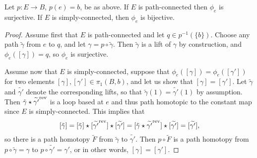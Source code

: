\begin{prop}
  \label{lifting-correspondence-props}
  Let $p : E \to B$, $p(e) = b$, be as above. If $E$ is path-connected then $\phi_e$ is surjective. If $E$ is simply-connected, then $\phi_e$ is bijective.
\end{prop}
\begin{proof}
  Assume first that $E$ is path-connected and let $q \in p^{-1}(\{b\})$. Choose any path $\tilde{\gamma}$ from $e$ to $q$, and let $\gamma = p \circ \tilde{\gamma}$. Then $\tilde{\gamma}$ is a lift of $\gamma$ by construction, and $\phi_e([\gamma]) = q$, so $\phi_e$ is surjective.
  
  Assume now that $E$ is simply-connected, suppose that $\phi_e([\gamma]) = \phi_e([\gamma'])$ for two elements $[\gamma], [\gamma'] \in \pi_1(B,b)$, and let us show that $[\gamma] = [\gamma']$. Let $\tilde{\gamma}$ and $\widetilde{\gamma'}$ denote the corresponding lifts, so that $\tilde{\gamma}(1) = \tilde{\gamma'}(1)$ by assumption. Then $\tilde{\gamma} \star \widetilde{\gamma'}^{\mathrm{rev}}$ is a loop based at $e$ and thus path homotopic to the constant map since $E$ is simply-connected. This implies that
  \[
    [\tilde{\gamma}] = [\tilde{\gamma}] \star [\widetilde{\gamma'}^{\mathrm{rev}}] \star [\widetilde{\gamma'}] = [\tilde{\gamma} \star \widetilde{\gamma'}^{\mathrm{rev}}] \star [\widetilde{\gamma'}] = [\widetilde{\gamma'}],
  \]
  so there is a path homotopy $\tilde{F}$ from $\tilde{\gamma}$ to $\widetilde{\gamma'}$. Then $p \circ \tilde{F}$ is a path homotopy from $p \circ \tilde{\gamma} = \gamma$ to $p \circ \widetilde{\gamma'} = \gamma'$, or in other words, $[\gamma] = [\gamma']$.
\end{proof}

